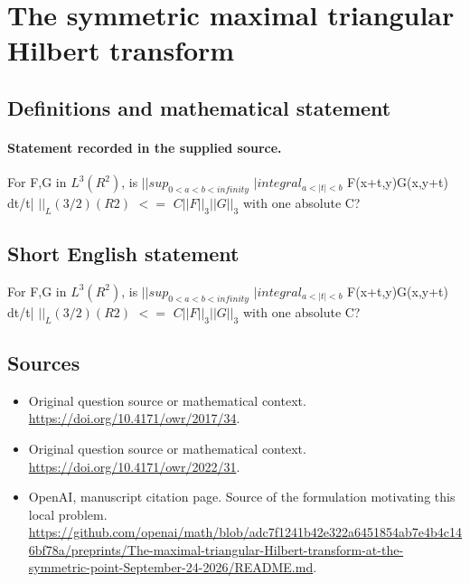 \documentclass[11pt]{article}
\begin{document}
\section*{The symmetric maximal triangular Hilbert transform}\label{statement}
\subsection{Definitions and mathematical statement}
\paragraph{Statement recorded in the supplied source.}
For F,G in $L^3(R^2)$, is $||sup_{0<a<b<infinity}$ $|integral_{a<|t|<b}$ F(x+t,y)G(x,y+t) dt/t| $||_L(3/2)(R2)$ $<=$ $C||F||_3||G||_3$ with one absolute C?
\subsection{Short English statement}
For F,G in $L^3(R^2)$, is $||sup_{0<a<b<infinity}$ $|integral_{a<|t|<b}$ F(x+t,y)G(x,y+t) dt/t| $||_L(3/2)(R2)$ $<=$ $C||F||_3||G||_3$ with one absolute C?
\subsection{Sources}
\begin{itemize}
\item[S1] Original question source or mathematical context.
\url{https://doi.org/10.4171/owr/2017/34}.
\item[S2] Original question source or mathematical context.
\url{https://doi.org/10.4171/owr/2022/31}.
\item[S3] OpenAI, manuscript citation page. Source of the formulation motivating this local problem.
\url{https://github.com/openai/math/blob/adc7f1241b42e322a6451854ab7e4b4c146bf78a/preprints/The-maximal-triangular-Hilbert-transform-at-the-symmetric-point-September-24-2026/README.md}.
\end{itemize}
\end{document}
